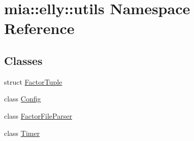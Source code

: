 \hypertarget{namespacemia_1_1elly_1_1utils}{\section{mia\-:\-:elly\-:\-:utils Namespace Reference}
\label{namespacemia_1_1elly_1_1utils}
}
\subsection*{Classes}
\begin{DoxyCompactItemize}
\item 
struct \hyperlink{structmia_1_1elly_1_1utils_1_1_factor_tuple}{Factor\-Tuple}
\item 
class \hyperlink{classmia_1_1elly_1_1utils_1_1_config}{Config}
\item 
class \hyperlink{classmia_1_1elly_1_1utils_1_1_factor_file_parser}{Factor\-File\-Parser}
\item 
class \hyperlink{classmia_1_1elly_1_1utils_1_1_timer}{Timer}
\end{DoxyCompactItemize}
